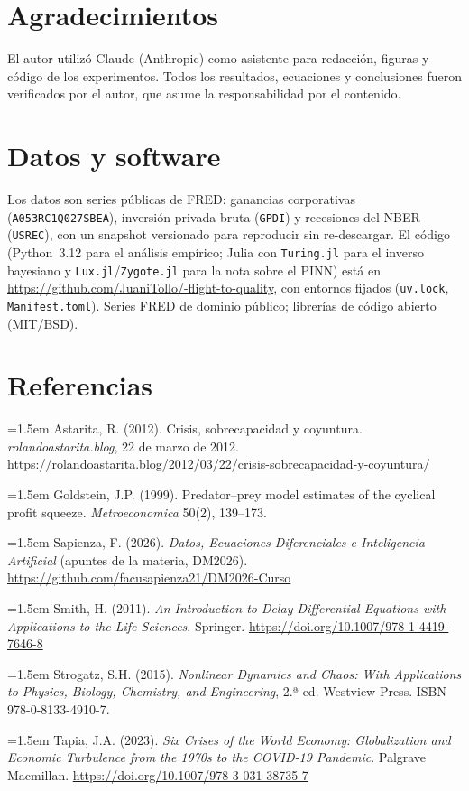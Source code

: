 \documentclass[11pt]{article}
\begin{document}
\section*{Agradecimientos}
El autor utilizó Claude (Anthropic) como asistente para redacción, figuras y código de los
experimentos. Todos los resultados, ecuaciones y conclusiones fueron verificados por el autor,
que asume la responsabilidad por el contenido.

\section*{Datos y software}
Los datos son series públicas de FRED: ganancias corporativas (\texttt{A053RC1Q027SBEA}),
inversión privada bruta (\texttt{GPDI}) y recesiones del NBER (\texttt{USREC}), con un snapshot
versionado para reproducir sin re-descargar. El código (Python~3.12 para el análisis empírico;
Julia con \texttt{Turing.jl} para el inverso bayesiano y \texttt{Lux.jl}/\texttt{Zygote.jl} para
la nota sobre el PINN) está en \url{https://github.com/JuaniTollo/-flight-to-quality}, con entornos
fijados (\texttt{uv.lock}, \texttt{Manifest.toml}). Series FRED de dominio público; librerías de
código abierto (MIT/BSD).

\section*{Referencias}
{\small
\setlength{\parindent}{0pt}
\setlength{\parskip}{4pt}
\hangindent=1.5em Astarita, R. (2012). Crisis, sobrecapacidad y coyuntura. \emph{rolandoastarita.blog}, 22 de marzo de 2012. \url{https://rolandoastarita.blog/2012/03/22/crisis-sobrecapacidad-y-coyuntura/}\par
\hangindent=1.5em Goldstein, J.P. (1999). Predator--prey model estimates of the cyclical profit squeeze. \emph{Metroeconomica} 50(2), 139--173.\par
\hangindent=1.5em Sapienza, F. (2026). \emph{Datos, Ecuaciones Diferenciales e Inteligencia Artificial} (apuntes de la materia, DM2026). \url{https://github.com/facusapienza21/DM2026-Curso}\par
\hangindent=1.5em Smith, H. (2011). \emph{An Introduction to Delay Differential Equations with Applications to the Life Sciences}. Springer. \url{https://doi.org/10.1007/978-1-4419-7646-8}\par
\hangindent=1.5em Strogatz, S.H. (2015). \emph{Nonlinear Dynamics and Chaos: With Applications to Physics, Biology, Chemistry, and Engineering}, 2.ª ed. Westview Press. ISBN 978-0-8133-4910-7.\par
\hangindent=1.5em Tapia, J.A. (2023). \emph{Six Crises of the World Economy: Globalization and Economic Turbulence from the 1970s to the COVID-19 Pandemic}. Palgrave Macmillan. \url{https://doi.org/10.1007/978-3-031-38735-7}\par
}
\end{document}
